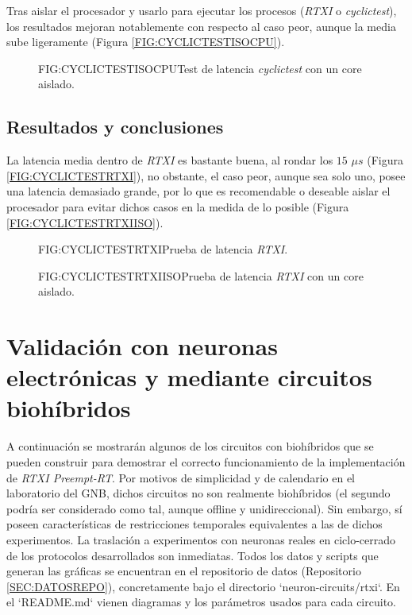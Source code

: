 Tras aislar el procesador y usarlo para ejecutar los procesos (\textit{RTXI} o \textit{cyclictest}), los resultados mejoran notablemente con respecto al caso peor, aunque la media sube ligeramente (Figura \ref{FIG:CYCLICTESTISOCPU}).

\begin{figure}[Ejecución de cylictest con un core aislado]{FIG:CYCLICTESTISOCPU}{Test de latencia \textit{cyclictest} con un core aislado.}
\end{figure}


\subsection{Resultados y conclusiones\label{SS:RESULTADOS}}


La latencia media dentro de \textit{RTXI} es bastante buena, al rondar los $15$ $\mu s$ (Figura \ref{FIG:CYCLICTESTRTXI}), no obstante, el caso peor, aunque sea solo uno, posee una latencia demasiado grande, por lo que es recomendable o deseable aislar el procesador para evitar dichos casos en la medida de lo posible (Figura \ref{FIG:CYCLICTESTRTXIISO}).

\begin{figure}[Prueba de latencia RTXI]{FIG:CYCLICTESTRTXI}{Prueba de latencia \textit{RTXI}.}
\end{figure}

\begin{figure}[Prueba de latencia RTXI con un core aislado]{FIG:CYCLICTESTRTXIISO}{Prueba de latencia \textit{RTXI} con un core aislado.}
\end{figure}


\section{Validación con neuronas electrónicas y mediante circuitos biohíbridos\label{SEC:EJEMPLOSCIRCUITOSBIOHIBRIDOS}}


A continuación se mostrarán algunos de los circuitos con biohíbridos que se pueden construir para demostrar el correcto funcionamiento de la implementación de \textit{RTXI Preempt-RT}. Por motivos de simplicidad y de calendario en el laboratorio del GNB, dichos circuitos no son realmente biohíbridos (el segundo podría ser considerado como tal, aunque offline y unidireccional). Sin embargo, sí poseen características de restricciones temporales equivalentes a las de dichos experimentos. La traslación a experimentos con neuronas reales en ciclo-cerrado de los protocolos desarrollados son inmediatas. Todos los datos y scripts que generan las gráficas se encuentran en el repositorio de datos (Repositorio \ref{SEC:DATOSREPO}), concretamente bajo el directorio `neuron-circuits/rtxi`. En el `README.md` vienen diagramas y los parámetros usados para cada circuito.


